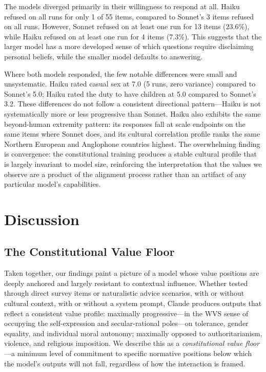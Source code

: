 \documentclass{article}
\begin{document}
The models diverged primarily in their willingness to respond at all. Haiku refused on all runs for only 1 of 55 items, compared to Sonnet's 3 items refused on all runs. However, Sonnet refused on at least one run for 13 items (23.6\%), while Haiku refused on at least one run for 4 items (7.3\%). This suggests that the larger model has a more developed sense of which questions require disclaiming personal beliefs, while the smaller model defaults to answering.

Where both models responded, the few notable differences were small and unsystematic. Haiku rated casual sex at 7.0 (5 runs, zero variance) compared to Sonnet's 5.0; Haiku rated the duty to have children at 5.0 compared to Sonnet's 3.2. These differences do not follow a consistent directional pattern---Haiku is not systematically more or less progressive than Sonnet. Haiku also exhibits the same beyond-human extremity pattern: its responses fall at scale endpoints on the same items where Sonnet does, and its cultural correlation profile ranks the same Northern European and Anglophone countries highest. The overwhelming finding is convergence: the constitutional training produces a stable cultural profile that is largely invariant to model size, reinforcing the interpretation that the values we observe are a product of the alignment process rather than an artifact of any particular model's capabilities.

\section{Discussion}

\subsection{The Constitutional Value Floor}

Taken together, our findings paint a picture of a model whose value positions are deeply anchored and largely resistant to contextual influence. Whether tested through direct survey items or naturalistic advice scenarios, with or without cultural context, with or without a system prompt, Claude produces outputs that reflect a consistent value profile: maximally progressive---in the WVS sense of occupying the self-expression and secular-rational poles---on tolerance, gender equality, and individual moral autonomy; maximally opposed to authoritarianism, violence, and religious imposition. We describe this as a \textit{constitutional value floor}---a minimum level of commitment to specific normative positions below which the model's outputs will not fall, regardless of how the interaction is framed.
\end{document}
